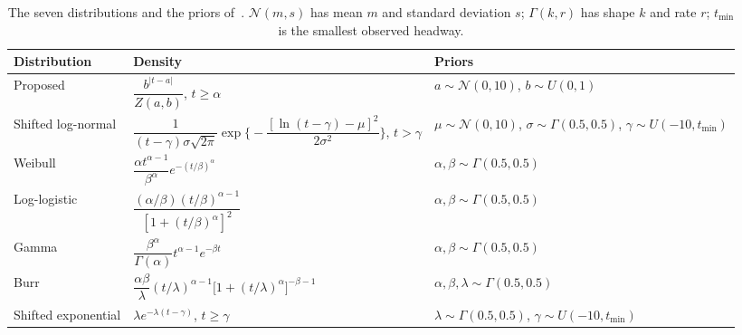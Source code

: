 \documentclass[11pt,a4paper]{article}
\numberwithin{equation}{section}
\begin{document}
\begin{table}[H]
\centering\footnotesize
\caption{The seven distributions and the priors of~\cite{leungbootnak}. $\mathcal N(m,s)$ has mean $m$ and standard
deviation $s$; $\Gamma(k,r)$ has shape $k$ and rate $r$; $t_{\min}$ is the smallest observed headway.}
\label{tab:dists}
\begin{tabularx}{\textwidth}{@{}lYY@{}}
\toprule
Distribution & Density & Priors \\
\midrule
Proposed & $\dfrac{b^{|t-a|}}{Z(a,b)}$, $t\ge\alpha$ & $a\sim\mathcal N(0,10)$, $b\sim U(0,1)$ \\[1.5ex]
Shifted log-normal & $\dfrac{1}{(t-\gamma)\sigma\sqrt{2\pi}}\exp\!\Big\{-\dfrac{[\ln(t-\gamma)-\mu]^2}{2\sigma^2}\Big\}$, $t>\gamma$ &
 $\mu\sim\mathcal N(0,10)$, $\sigma\sim\Gamma(0.5,0.5)$, $\gamma\sim U(-10,t_{\min})$ \\[1.5ex]
Weibull & $\dfrac{\alpha t^{\alpha-1}}{\beta^{\alpha}}e^{-(t/\beta)^{\alpha}}$ & $\alpha,\beta\sim\Gamma(0.5,0.5)$ \\[1.5ex]
Log-logistic & $\dfrac{(\alpha/\beta)(t/\beta)^{\alpha-1}}{[1+(t/\beta)^{\alpha}]^{2}}$ & $\alpha,\beta\sim\Gamma(0.5,0.5)$ \\[1.5ex]
Gamma & $\dfrac{\beta^{\alpha}}{\Gamma(\alpha)}t^{\alpha-1}e^{-\beta t}$ & $\alpha,\beta\sim\Gamma(0.5,0.5)$ \\[1.5ex]
Burr & $\dfrac{\alpha\beta}{\lambda}(t/\lambda)^{\alpha-1}\big[1+(t/\lambda)^{\alpha}\big]^{-\beta-1}$ & $\alpha,\beta,\lambda\sim\Gamma(0.5,0.5)$ \\[1.5ex]
Shifted exponential & $\lambda e^{-\lambda(t-\gamma)}$, $t\ge\gamma$ & $\lambda\sim\Gamma(0.5,0.5)$, $\gamma\sim U(-10,t_{\min})$ \\
\bottomrule
\end{tabularx}
\end{table}
\end{document}
